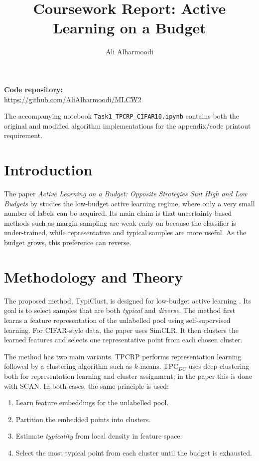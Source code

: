 \documentclass[10pt,a4paper,twocolumn]{article}
\title{\vspace{-1.5em}Coursework Report: Active Learning on a Budget\vspace{-0.75em}}
\author{Ali Alharmoodi}
\date{}
\begin{document}
\maketitle
\vspace{-1.5em}

\noindent\textbf{Code repository:}\\
\url{https://github.com/AliAlharmoodi/MLCW2}

\noindent The accompanying notebook \texttt{Task1\_TPCRP\_CIFAR10.ipynb} contains both the original and modified algorithm implementations for the appendix/code printout requirement.

\section{Introduction}
The paper \emph{Active Learning on a Budget: Opposite Strategies Suit High and Low Budgets} by \citet{hacohen2022active} studies the low-budget active learning regime, where only a very small number of labels can be acquired. Its main claim is that uncertainty-based methods such as margin sampling are weak early on because the classifier is under-trained, while representative and typical samples are more useful. As the budget grows, this preference can reverse.

\section{Methodology and Theory}
The proposed method, TypiClust, is designed for low-budget active learning \citep{hacohen2022active}. Its goal is to select samples that are both \emph{typical} and \emph{diverse}. The method first learns a feature representation of the unlabelled pool using self-supervised learning. For CIFAR-style data, the paper uses SimCLR. It then clusters the learned features and selects one representative point from each chosen cluster.

The method has two main variants. TPCRP performs representation learning followed by a clustering algorithm such as $k$-means. TPC$_{DC}$ uses deep clustering both for representation learning and cluster assignment; in the paper this is done with SCAN. In both cases, the same principle is used:

\begin{enumerate}
    \item Learn feature embeddings for the unlabelled pool.
    \item Partition the embedded points into clusters.
    \item Estimate \emph{typicality} from local density in feature space.
    \item Select the most typical point from each cluster until the budget is exhausted.
\end{enumerate}
\end{document}

